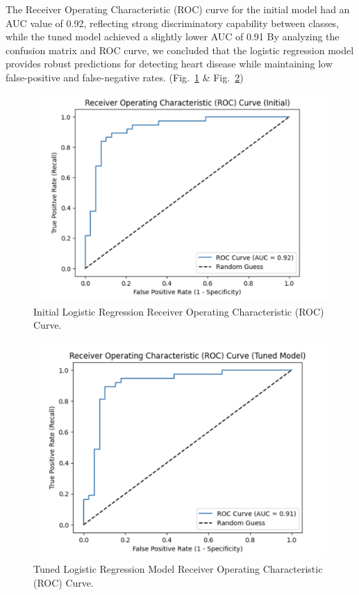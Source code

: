The Receiver Operating Characteristic (ROC) curve for the initial model had an AUC value of 0.92, reflecting strong discriminatory capability between classes, while the tuned model achieved a slightly lower AUC of 0.91
By analyzing the confusion matrix and ROC curve, we concluded that the logistic regression model provides robust predictions for detecting heart disease while maintaining low false-positive and false-negative rates. (Fig.~\ref{Initial Logistic Regression Receiver Operating Characteristic (ROC) Curve} \& Fig.~\ref{Tuned Logistic Regression Model Receiver Operating Characteristic (ROC) Curve})

\begin{figure}[htbp]
    \centerline{\includegraphics[scale=0.2]{img/receiver_operating_characteristic_curve_inital.png}}
    \caption{Initial Logistic Regression Receiver Operating Characteristic (ROC) Curve.}\label{Initial Logistic Regression Receiver Operating Characteristic (ROC) Curve}
\end{figure}

\begin{figure}[htbp]
    \centerline{\includegraphics[scale=0.2]{img/receiver_operating_characteristic_curve_tuned_model.png}}
    \caption{Tuned Logistic Regression Model Receiver Operating Characteristic (ROC) Curve.}\label{Tuned Logistic Regression Model Receiver Operating Characteristic (ROC) Curve}
\end{figure}

